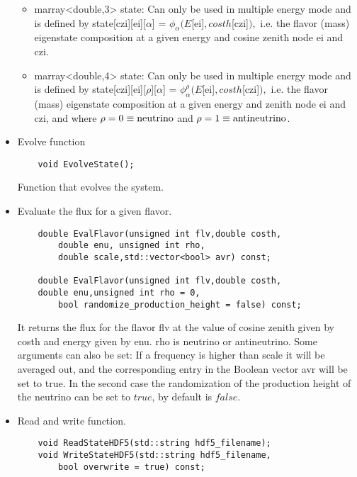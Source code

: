\documentclass[3p,12pt]{elsarticle}
\newcommand{\ttf}{\ttfamily}
\begin{document}
\begin{itemize}
  \begin{itemize}
  \item {\ttf marray<double,3> state}: Can only be used in
    multiple energy mode and is defined by {\ttf
      state[czi][ei][$\alpha$]  = $\phi_\alpha (E$[ei]$,costh$[czi]$),$ } i.e. the
    flavor (mass) eigenstate composition at a given energy and cosine
    zenith node {\ttf ei} and {\ttf czi}. 
  \item {\ttf marray<double,4> state}: Can only be used in
    multiple energy mode and is defined by {\ttf
      state[czi][ei][$\rho$][$\alpha$]  = $\phi^{\rho}_\alpha
      (E$[ei]$,costh$[czi]$),$ } i.e. the flavor (mass) eigenstate
    composition at a given energy and zenith node {\ttf ei} and {\ttf czi}, and where
    $\rho = 0 \equiv {\rm neutrino}$ and $\rho = 1 \equiv {\rm
      antineutrino}$. 
  \end{itemize}
  
\item Evolve function
  \begin{lstlisting}
    void EvolveState();
  \end{lstlisting}
  Function that evolves the system.

\item Evaluate the flux for a given flavor.
  \begin{lstlisting}
    double EvalFlavor(unsigned int flv,double costh,
        double enu, unsigned int rho,
        double scale,std::vector<bool> avr) const;

    double EvalFlavor(unsigned int flv,double costh,
    double enu,unsigned int rho = 0,
        bool randomize_production_height = false) const;
  \end{lstlisting}
  It returns the flux for the flavor {\ttf flv} at the value of cosine
  zenith given by {\ttf costh} and energy given by {\ttf enu}.
  {\ttf rho} is {\ttf neutrino} or {\ttf antineutrino}.
  Some arguments can also be set: If a frequency is higher than {\ttf
    scale} it will be averaged out, and the corresponding entry in the
  Boolean vector {\ttf avr} will be set to {\ttf true}.
  In the second case the randomization of the production height of the
  neutrino can be set to $true$, by default is $false$.
  
\item Read and write function.
  \begin{lstlisting}
    void ReadStateHDF5(std::string hdf5_filename);
    void WriteStateHDF5(std::string hdf5_filename,
        bool overwrite = true) const;
  \end{lstlisting}
  

\end{itemize}
\end{document}
